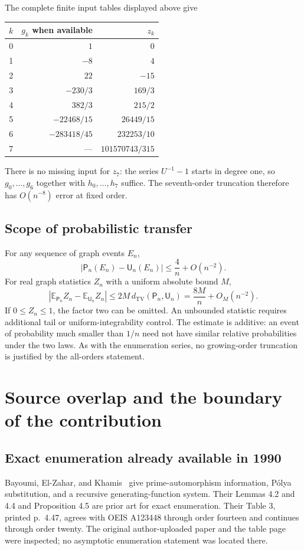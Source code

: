 \documentclass[11pt,letterpaper]{article}
\numberwithin{equation}{section}
\theoremstyle{definition}\newtheorem{definition}[theorem]{Definition}
\theoremstyle{remark}\newtheorem{remark}[theorem]{Remark}
\newcommand{\EE}{\mathbb E}
\DeclareMathOperator{\TV}{TV}
\begin{document}
The complete finite input tables displayed above give
\begin{center}
\begin{tabular}{r r r}
\toprule
$k$ & $g_k$ when available & $z_k$\\
\midrule
0&$1$&$0$\\
1&$-8$&$4$\\
2&$22$&$-15$\\
3&$-230/3$&$169/3$\\
4&$382/3$&$215/2$\\
5&$-22468/15$&$26449/15$\\
6&$-283418/45$&$232253/10$\\
7&---&$101570743/315$\\
\bottomrule
\end{tabular}
\end{center}
There is no missing input for $z_7$: the series $U^{-1}-1$ starts
in degree one, so $g_0,\ldots,g_6$ together with
$h_0,\ldots,h_7$ suffice. The seventh-order truncation therefore
has $O(n^{-8})$ error at fixed order.

\subsection{Scope of probabilistic transfer}
For any sequence of graph events $E_n$,
\[
 |\mathsf P_n(E_n)-\mathsf U_n(E_n)|\leq\frac4n+O(n^{-2}).
\]
For real graph statistics $Z_n$ with a uniform absolute bound $M$,
\[
 |\EE_{\mathsf P_n}Z_n-\EE_{\mathsf U_n}Z_n|
       \leq2M\,d_{\TV}(\mathsf P_n,\mathsf U_n)
       =\frac{8M}{n}+O_M(n^{-2}).
\]
If $0\leq Z_n\leq1$, the factor two can be omitted. An unbounded
statistic requires additional tail or uniform-integrability control.
The estimate is additive: an event of probability much smaller
than $1/n$ need not have similar relative probabilities under the
two laws. As with the enumeration series, no growing-order
truncation is justified by the all-orders statement.

\section{Source overlap and the boundary of the contribution}\label{prg:sec:sources}

\subsection{Exact enumeration already available in 1990}
Bayoumi, El-Zahar, and Khamis~\cite{BEK} give prime-automorphism
information, P\'olya substitution, and a recursive generating-function
system. Their Lemmas 4.2 and 4.4 and Proposition 4.5 are prior art
for exact enumeration. Their Table 3, printed p.~4.47, agrees with
OEIS A123448 through order fourteen and continues through order
twenty. The original author-uploaded paper and the table page were
inspected; no asymptotic enumeration statement was located there.
\end{document}
